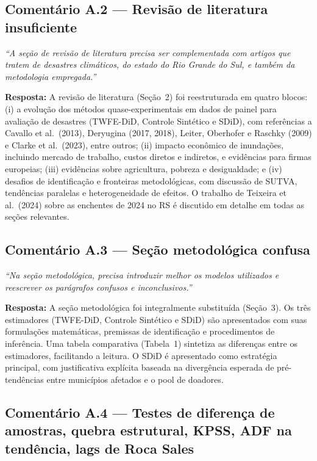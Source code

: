 \documentclass[a4paper,12pt]{article}
\newcommand{\avA}[1]{\textcolor{corA}{\textit{#1}}}
\newcommand{\resposta}[1]{\noindent\textbf{Resposta:} #1}
\begin{document}
\bigskip

\subsection*{Comentário A.2 — Revisão de literatura insuficiente}

\avA{``A seção de revisão de literatura precisa ser complementada com artigos que tratem
de desastres climáticos, do estado do Rio Grande do Sul, e também da metodologia
empregada.''}

\bigskip

\resposta{A revisão de literatura (Seção~2) foi reestruturada em quatro blocos: (i) a
evolução dos métodos quase-experimentais em dados de painel para avaliação de desastres
(TWFE-DiD, Controle Sintético e SDiD), com referências a Cavallo et al.\ (2013),
Deryugina (2017, 2018), Leiter, Oberhofer e Raschky (2009) e Clarke et al.\ (2023),
entre outros; (ii) impacto econômico de inundações, incluindo mercado de trabalho,
custos diretos e indiretos, e evidências para firmas europeias; (iii) evidências sobre
agricultura, pobreza e desigualdade; e (iv) desafios de identificação e fronteiras
metodológicas, com discussão de SUTVA, tendências paralelas e heterogeneidade de
efeitos. O trabalho de Teixeira et al.\ (2024) sobre as enchentes de 2024 no RS é
discutido em detalhe em todas as seções relevantes.}

\bigskip

\subsection*{Comentário A.3 — Seção metodológica confusa}

\avA{``Na seção metodológica, precisa introduzir melhor os modelos utilizados e
reescrever os parágrafos confusos e inconclusivos.''}

\bigskip

\resposta{A seção metodológica foi integralmente substituída (Seção~3). Os três
estimadores (TWFE-DiD, Controle Sintético e SDiD) são apresentados com suas
formulações matemáticas, premissas de identificação e procedimentos de inferência.
Uma tabela comparativa (Tabela~1) sintetiza as diferenças entre os estimadores,
facilitando a leitura. O SDiD é apresentado como estratégia principal, com
justificativa explícita baseada na divergência esperada de pré-tendências entre
municípios afetados e o pool de doadores.}

\bigskip

\subsection*{Comentário A.4 — Testes de diferença de amostras, quebra estrutural,
KPSS, ADF na tendência, lags de Roca Sales}
\end{document}
